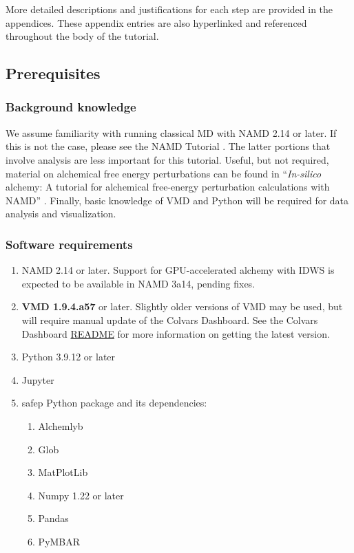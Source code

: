 \documentclass[9pt,tutorial]{Styling/livecoms}
\begin{document}
More detailed descriptions and justifications for each step are provided in the appendices. These appendix entries are also hyperlinked and referenced throughout the body of the tutorial.

\subsection{Prerequisites}
    \subsubsection{Background knowledge}\label{sec:prerequisites}
    
    We assume familiarity with running classical MD with NAMD 2.14 or later. If this is not the case, please see the NAMD Tutorial \cite{phillips2003}. The latter portions that involve analysis are less important for this tutorial. Useful, but not required, material on alchemical free energy perturbations can be found in “\textit{In-silico} alchemy: A tutorial for alchemical free-energy perturbation calculations with NAMD” \cite{Henin2017}. Finally, basic knowledge of VMD and Python will be required for data analysis and visualization.  

\subsubsection{Software requirements}\label{sec:7.2}
    \begin{enumerate}
        \item NAMD 2.14 or later. Support for GPU-accelerated alchemy with IDWS is expected to be available in NAMD 3a14, pending fixes.
        \item \textbf{VMD 1.9.4.a57} or later. Slightly older versions of VMD may be used, but will require manual update of the Colvars Dashboard. See the Colvars Dashboard \href{https://github.com/Colvars/colvars/tree/master/vmd/cv_dashboard}{README} for more information on getting the latest version. 
        \item Python 3.9.12 or later
        \item Jupyter
        \item safep Python package and its dependencies:
        \begin{enumerate}
        \item Alchemlyb
        \item Glob
        \item MatPlotLib
        \item Numpy 1.22 or later
        \item Pandas
        \item PyMBAR
        \end{enumerate}
    \end{enumerate}
\end{document}
